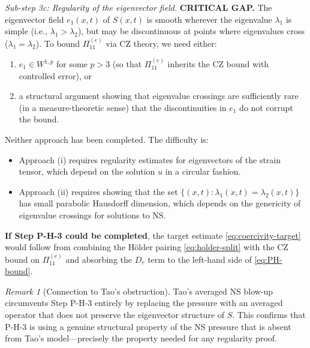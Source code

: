 \documentclass[11pt]{article}
\theoremstyle{definition}
\theoremstyle{remark}
\newtheorem{remark}[theorem]{Remark}
\begin{document}
\smallskip
\noindent\emph{Sub-step 3c: Regularity of the eigenvector field.}
\textbf{CRITICAL GAP.}  The eigenvector field $e_1(x,t)$ of $S(x,t)$ is smooth
wherever the eigenvalue $\lambda_1$ is simple (i.e., $\lambda_1 > \lambda_2$), but
may be discontinuous at points where eigenvalues cross ($\lambda_1 = \lambda_2$).
To bound $\Pi_{11}^{(e)}$ via CZ theory, we need either:
\begin{enumerate}[nosep]
  \item[(i)] $e_1 \in W^{1,p}$ for some $p > 3$ (so that $\Pi_{11}^{(e)}$ inherits
    the CZ bound with controlled error), or
  \item[(ii)] a structural argument showing that eigenvalue crossings are
    sufficiently rare (in a measure-theoretic sense) that the discontinuities in
    $e_1$ do not corrupt the bound.
\end{enumerate}

Neither approach has been completed.  The difficulty is:

\begin{itemize}[nosep]
  \item Approach (i) requires regularity estimates for eigenvectors of the strain
    tensor, which depend on the solution $u$ in a circular fashion.
  \item Approach (ii) requires showing that the set
    $\{(x,t) : \lambda_1(x,t) = \lambda_2(x,t)\}$ has small parabolic Hausdorff
    dimension, which depends on the genericity of eigenvalue crossings for
    solutions to NS.
\end{itemize}

\textbf{If Step P-H-3 could be completed}, the target estimate \eqref{eq:coercivity-target}
would follow from combining the H\"older pairing \eqref{eq:holder-split} with the CZ bound
on $\Pi_{11}^{(e)}$ and absorbing the $D_r$ term to the left-hand side of
\eqref{eq:PH-bound}.

\begin{remark}[Connection to Tao's obstruction]
Tao's averaged NS blow-up \cite{Tao} circumvents Step P-H-3 entirely by replacing
the pressure with an averaged operator that does not preserve the eigenvector
structure of $S$.  This confirms that P-H-3 is using a genuine structural property
of the NS pressure that is absent from Tao's model---precisely the property needed
for any regularity proof.
\end{remark}
\end{document}

